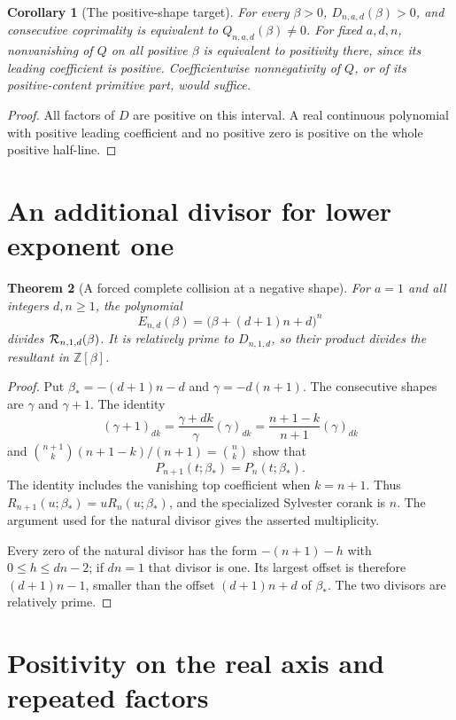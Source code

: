 \documentclass[11pt]{article}
\newtheorem{theorem}{Theorem}
\newtheorem{corollary}[theorem]{Corollary}
\newcommand{\Z}{\mathbb Z}
\begin{document}
\begin{corollary}[The positive-shape target]\label{cor:positive-target}
For every $\beta>0$, $D_{n,a,d}(\beta)>0$, and consecutive
coprimality is equivalent to $Q_{n,a,d}(\beta)\ne0$.
For fixed $a,d,n$, nonvanishing of $Q$ on all positive $\beta$ is
equivalent to positivity there, since its leading coefficient is positive.
Coefficientwise nonnegativity of $Q$, or of its positive-content
primitive part, would suffice.
\end{corollary}
\begin{proof}
All factors of $D$ are positive on this interval. A real continuous
polynomial with positive leading coefficient and no positive zero
is positive on the whole positive half-line.
\end{proof}


\section{An additional divisor for lower exponent one}

\begin{theorem}[A forced complete collision at a negative shape]
\label{thm:lower-one-extra-factor}
For $a=1$ and all integers $d,n\ge1$, the polynomial
\[
 E_{n,d}(\beta)=\bigl(\beta+(d+1)n+d\bigr)^n
\]
divides $ {\cal R}_{n,1,d}(\beta)$.
It is relatively prime to $D_{n,1,d}$, so their product divides
the resultant in $\Z[\beta]$.
\end{theorem}
\begin{proof}
Put $\beta_* =-(d+1)n-d$ and $\gamma=-d(n+1)$.
The consecutive shapes are $\gamma$ and $\gamma+1$.
The identity
\[
 (\gamma+1)_{dk}=\frac{\gamma+dk}{\gamma}(\gamma)_{dk}
              =\frac{n+1-k}{n+1}(\gamma)_{dk}
\]
and
$\binom{n+1}{k}(n+1-k)/(n+1)=\binom nk$ show that
\[
 P_{n+1}(t;\beta_*)=P_n(t;\beta_*).
\]
The identity includes the vanishing top coefficient when $k=n+1$.
Thus $R_{n+1}(u;\beta_*)=uR_n(u;\beta_*)$, and the specialized
Sylvester corank is $n$. The argument used for the natural divisor
gives the asserted multiplicity.

Every zero of the natural divisor has the form
$-(n+1)-h$ with $0\le h\le dn-2$; if $dn=1$ that divisor is one.
Its largest offset is therefore $(d+1)n-1$, smaller than the offset
$(d+1)n+d$ of $\beta_*$. The two divisors are relatively prime.
\end{proof}

\section{Positivity on the real axis and repeated factors}
\end{document}
